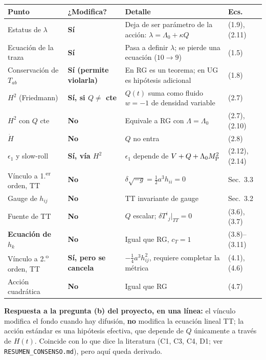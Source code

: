 \documentclass[11pt,a4paper]{article}
\newcommand{\MP}{M_{\rm P}}
\begin{document}
\begin{center}\small
\renewcommand{\arraystretch}{1.25}
\begin{tabular}{@{}L{4.1cm}L{2.7cm}L{6.3cm}L{1.9cm}@{}}
\toprule
\textbf{Punto} & \textbf{¿Modifica?} & \textbf{Detalle} & \textbf{Ecs.}\\
\midrule
Estatus de $\lambda$ & \textbf{Sí} & Deja de ser parámetro de la acción: $\lambda=\Lambda_0+\kappa Q$ & (1.9), (2.11)\\
Ecuación de la traza & \textbf{Sí} & Pasa a definir $\lambda$; se pierde una ecuación ($10\to9$) & (1.5)\\
Conservación de $T_{ab}$ & \textbf{Sí (permite violarla)} & En RG es un teorema; en UG es hipótesis adicional & (1.8)\\
$H^2$ (Friedmann) & \textbf{Sí, si $Q\neq$ cte} & $Q(t)$ suma como fluido $w=-1$ de densidad variable & (2.7)\\
$H^2$ con $Q$ cte & \textbf{No} & Equivale a RG con $\Lambda=\Lambda_0$ & (2.7), (2.10)\\
$\dot H$ & \textbf{No} & $Q$ no entra & (2.8)\\
$\epsilon_1$ y slow-roll & \textbf{Sí, vía $H^2$} & $\epsilon_1$ depende de $V+Q+\Lambda_0\MP^2$ & (2.12), (2.14)\\
Vínculo a 1.\textsuperscript{er} orden, TT & \textbf{No} & $\delta\sqrt{-g}=\tfrac12a^3h_{ii}=0$ & Sec.~3.3\\
Gauge de $h_{ij}$ & \textbf{No} & TT invariante de gauge & Sec.~3.2\\
Fuente de TT & \textbf{No} & $Q$ escalar; $\delta T^i{}_j|_{TT}=0$ & (3.6), (3.7)\\
\textbf{Ecuación de $h_k$} & \textbf{No} & Igual que RG, $c_T=1$ & (3.8)--(3.11)\\
Vínculo a 2.\textsuperscript{o} orden, TT & \textbf{Sí, pero se cancela} & $-\tfrac14a^3h_{ij}^2$, requiere completar la métrica & (4.1), (4.6)\\
Acción cuadrática & \textbf{No} & Igual que RG & (4.7)\\
\bottomrule
\end{tabular}
\end{center}

\textbf{Respuesta a la pregunta (b) del proyecto, en una línea:} el vínculo modifica el fondo cuando hay difusión, \textbf{no} modifica la ecuación lineal TT; la acción estándar es una hipótesis efectiva, que depende de $Q$ únicamente a través de $H(t)$. Coincide con lo que dice la literatura (C1, C3, C4, D1; ver \texttt{RESUMEN\_CONSENSO.md}), pero aquí queda derivado.
\end{document}
